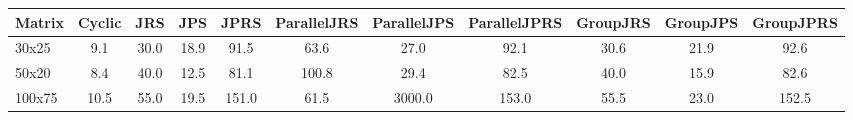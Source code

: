 \begin{tabular}{lcccccccccc}
\toprule
Matrix & Cyclic & JRS & JPS & JPRS & ParallelJRS & ParallelJPS & ParallelJPRS & GroupJRS & GroupJPS & GroupJPRS \\
\midrule
30x25 & 9.1 & 30.0 & 18.9 & 91.5 & 63.6 & 27.0 & 92.1 & 30.6 & 21.9 & 92.6 \\
50x20 & 8.4 & 40.0 & 12.5 & 81.1 & 100.8 & 29.4 & 82.5 & 40.0 & 15.9 & 82.6 \\
100x75 & 10.5 & 55.0 & 19.5 & 151.0 & 61.5 & 3000.0 & 153.0 & 55.5 & 23.0 & 152.5 \\
\bottomrule
\end{tabular}
